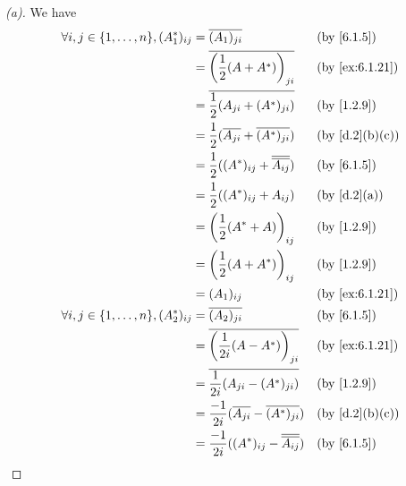 \begin{proof}[(a)]
  We have
  \begin{align*}
    \forall i, j \in \set{1, \dots, n}, (A_1^*)_{i j} & = \conj{(A_1)_{j i}}                                  &  & \text{(by \cref{6.1.5})}     \\
                                                      & = \conj{\pa{\frac{1}{2} (A + A^*)}_{j i}}             &  & \text{(by \cref{ex:6.1.21})} \\
                                                      & = \conj{\frac{1}{2} (A_{j i} + (A^*)_{j i})}          &  & \text{(by \cref{1.2.9})}     \\
                                                      & = \frac{1}{2} (\conj{A_{j i}} + \conj{(A^*)_{j i}})   &  & \text{(by \cref{d.2}(b)(c))} \\
                                                      & = \frac{1}{2} ((A^*)_{i j} + \conj{\conj{A_{i j}}})   &  & \text{(by \cref{6.1.5})}     \\
                                                      & = \frac{1}{2} ((A^*)_{i j} + A_{i j})                 &  & \text{(by \cref{d.2}(a))}    \\
                                                      & = \pa{\frac{1}{2} (A^* + A)}_{i j}                    &  & \text{(by \cref{1.2.9})}     \\
                                                      & = \pa{\frac{1}{2} (A + A^*)}_{i j}                    &  & \text{(by \cref{1.2.9})}     \\
                                                      & = (A_1)_{i j}                                         &  & \text{(by \cref{ex:6.1.21})} \\
    \forall i, j \in \set{1, \dots, n}, (A_2^*)_{i j} & = \conj{(A_2)_{j i}}                                  &  & \text{(by \cref{6.1.5})}     \\
                                                      & = \conj{\pa{\frac{1}{2i} (A - A^*)}_{j i}}            &  & \text{(by \cref{ex:6.1.21})} \\
                                                      & = \conj{\frac{1}{2i} (A_{j i} - (A^*)_{j i})}         &  & \text{(by \cref{1.2.9})}     \\
                                                      & = \frac{-1}{2i} (\conj{A_{j i}} - \conj{(A^*)_{j i}}) &  & \text{(by \cref{d.2}(b)(c))} \\
                                                      & = \frac{-1}{2i} ((A^*)_{i j} - \conj{\conj{A_{i j}}}) &  & \text{(by \cref{6.1.5})}     \\

\end{align*}
\end{proof}
